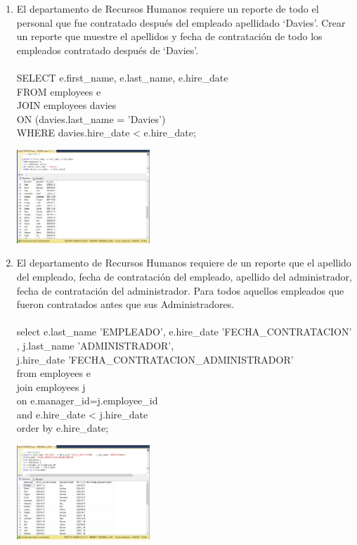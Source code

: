 \begin{enumerate}[1.]
	\item El departamento de Recursos Humanos requiere un reporte de todo el personal que fue contratado después del empleado apellidado ‘Davies’. Crear un reporte que muestre el apellidos y fecha de contrataci\'on de todo los empleados contratado después de ‘Davies’.
	\\
	\\SELECT e.first\_name, e.last\_name, e.hire\_date 
	\\FROM employees e 
	\\JOIN employees davies 
	\\ON (davies.last\_name = 'Davies') 
	\\WHERE davies.hire\_date < e.hire\_date;

	\begin{center}
	\includegraphics[width=5cm]{./Imagenes/8ejer7} 
	\end{center}


	\item El departamento de Recursos Humanos requiere de un reporte que el apellido del empleado, fecha de contrataci\'on del empleado, apellido del administrador, fecha de contratación del administrador. Para todos aquellos empleados que fueron contratados antes que sus Administradores.
	\\
	\\select e.last\_name 'EMPLEADO', e.hire\_date 'FECHA\_CONTRATACION' , j.last\_name 'ADMINISTRADOR', 
	\\j.hire\_date 'FECHA\_CONTRATACION\_ADMINISTRADOR'
	\\from employees e 
	\\join employees j 
	\\on e.manager\_id=j.employee\_id 
	\\and e.hire\_date < j.hire\_date 
	\\order by e.hire\_date;

	\begin{center}
	\includegraphics[width=5cm]{./Imagenes/8ejer8} 
	\end{center}

	\end{enumerate}
	
	


